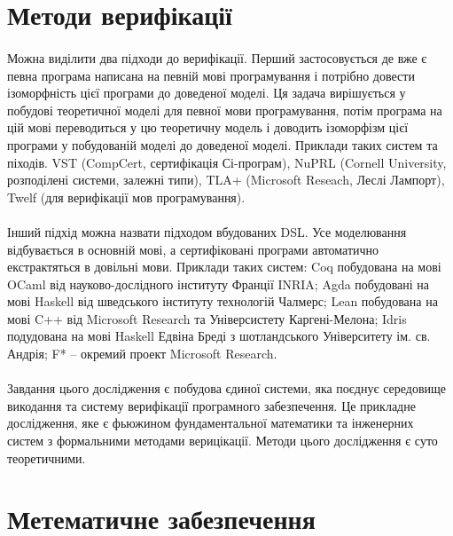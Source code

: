 \newpage
\section{Методи верифікації}

    \paragraph{}
    Можна виділити два підходи до верифікації. Перший застосовується де вже є
    певна програма написана на певній мові програмування і потрібно довести ізоморфність
    цієї програми до доведеної моделі. Ця задача вирішується у побудові теоретичної моделі
    для певної мови програмування, потім програма на цій мові переводиться у цю
    теоретичну модель і доводить ізоморфізм цієї програми у побудованій моделі до доведеної моделі.
    Приклади таких систем та піходів. VST (CompCert, сертифікація Сі-програм),
    NuPRL (Cornell University, розподілені системи, залежні типи),
    TLA+ (Microsoft Reseach, Леслі Лампорт), Twelf (для верифікації мов програмування).

    \paragraph{}
    Інший підхід можна назвати підходом вбудованих DSL. Усе моделювання відбувається
    в основній мові, а сертифіковані програми автоматично екстрактяться в довільні мови.
    Приклади таких систем: Coq побудована на мові OCaml від науково-дослідного
    інституту Франції INRIA; Agda побудовані на мові Haskell від шведського інституту технологій Чалмерс;
    Lean побудована на мові C++ від Microsoft Research та Універсистету Каргені-Мелона;
    Idris подудована на мові Haskell Едвіна Бреді з шотландського Університету ім. св. Андрія;
    F* -- окремий проект Microsoft Research.

    \paragraph{}
    Завдання цього дослідження є побудова єдиної системи, яка поєднує середовище
    викодання та систему верифікації програмного забезпечення. Це прикладне дослідження,
    яке є фьюжином фундаментальної математики та інженерних систем з формальними методами верицікації.
    Методи цього дослідження є суто теоретичними.

\newpage
\section{Метематичне забезпечення}
\vspace{0.3cm}

